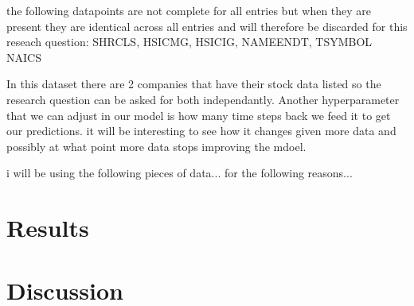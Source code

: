 \documentclass{report}
\begin{document}
the following datapoints are not complete for all entries but when they are present they are identical across all entries and will therefore be discarded for this reseach question: SHRCLS, HSICMG, HSICIG, NAMEENDT, TSYMBOL NAICS

In this dataset there are 2 companies that have their stock data listed so the research question can be asked for both independantly. Another hyperparameter that we can adjust in our model is how many time steps back we feed it to get our predictions. it will be interesting to see how it changes given more data and possibly at what point more data stops improving the mdoel.


i will be using the following pieces of data...
for the following reasons...

\section{Results}


\section{Discussion}
\end{document}
